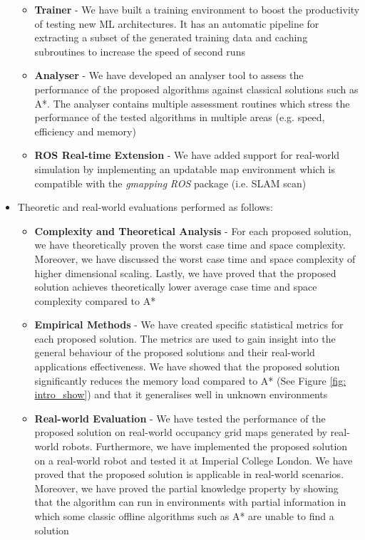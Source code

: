 \begin{itemize}
\begin{itemize}
        \item \textbf{Trainer} - We have built a training environment to boost the productivity of testing new ML architectures. It has an automatic pipeline for extracting a subset of the generated training data and caching subroutines to increase the speed of second runs
        \item \textbf{Analyser} - We have developed an analyser tool to assess the performance of the proposed algorithms against classical solutions such as A*. The analyser contains multiple assessment routines which stress the performance of the tested algorithms in multiple areas (e.g. speed, efficiency and memory)
        \item \textbf{ROS Real-time Extension} - We have added support for real-world simulation by implementing an updatable map environment which is compatible with the \textit{gmapping} \textit{ROS} package (i.e. SLAM scan)
    \end{itemize}
    \item Theoretic and real-world evaluations performed as follows: \begin{itemize}
        \item \textbf{Complexity and Theoretical Analysis} - For each proposed solution, we have theoretically proven the worst case time and space complexity. Moreover, we have discussed the worst case time and space complexity of higher dimensional scaling. Lastly, we have proved that the proposed solution achieves theoretically lower average case time and space complexity compared to A*
        \item \textbf{Empirical Methods} - We have created specific statistical metrics for each proposed solution. The metrics are used to gain insight into the general behaviour of the proposed solutions and their real-world applications effectiveness. We have showed that the proposed solution significantly reduces the memory load compared to A* (See Figure \ref{fig: intro_show}) and that it generalises well in unknown environments
        \item \textbf{Real-world Evaluation} - We have tested the performance of the proposed solution on real-world occupancy grid maps generated by real-world robots. Furthermore, we have implemented the proposed solution on a real-world robot and tested it at Imperial College London. We have proved that the proposed solution is applicable in real-world scenarios. Moreover, we have proved the partial knowledge property by showing that the algorithm can run in environments with partial information in which some classic offline algorithms such as A* are unable to find a solution
    \end{itemize}
\end{itemize}

